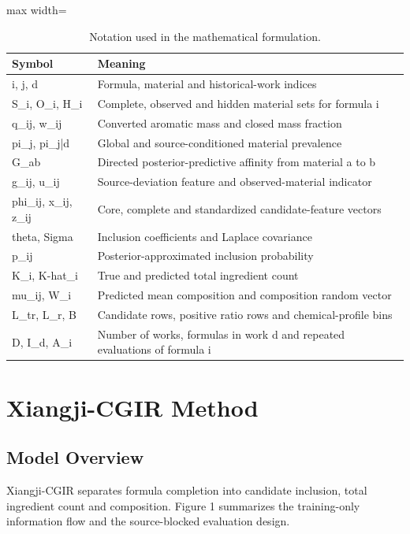 \documentclass[11pt]{article}
\begin{document}
\begin{table}[htbp]
\centering
\small
\caption{Notation used in the mathematical formulation.}
\label{tab:1}
\begin{adjustbox}{max width=\linewidth}
\begin{tabular}{@{}ll@{}}
\toprule
\textbf{Symbol} & \textbf{Meaning} \\
\midrule
i, j, d & Formula, material and historical-work indices \\
S\_i, O\_i, H\_i & Complete, observed and hidden material sets for formula i \\
q\_ij, w\_ij & Converted aromatic mass and closed mass fraction \\
pi\_j, pi\_j|d & Global and source-conditioned material prevalence \\
G\_ab & Directed posterior-predictive affinity from material a to b \\
g\_ij, u\_ij & Source-deviation feature and observed-material indicator \\
phi\_ij, x\_ij, z\_ij & Core, complete and standardized candidate-feature vectors \\
theta, Sigma & Inclusion coefficients and Laplace covariance \\
p\_ij & Posterior-approximated inclusion probability \\
K\_i, K-hat\_i & True and predicted total ingredient count \\
mu\_ij, W\_i & Predicted mean composition and composition random vector \\
L\_tr, L\_r, B & Candidate rows, positive ratio rows and chemical-profile bins \\
D, I\_d, A\_i & Number of works, formulas in work d and repeated evaluations of formula i \\
\bottomrule
\end{tabular}
\end{adjustbox}
\end{table}

\section{Xiangji-CGIR Method}

\subsection{Model Overview}

Xiangji-CGIR separates formula completion into candidate inclusion, total ingredient count and composition. Figure 1 summarizes the training-only information flow and the source-blocked evaluation design.
\end{document}
